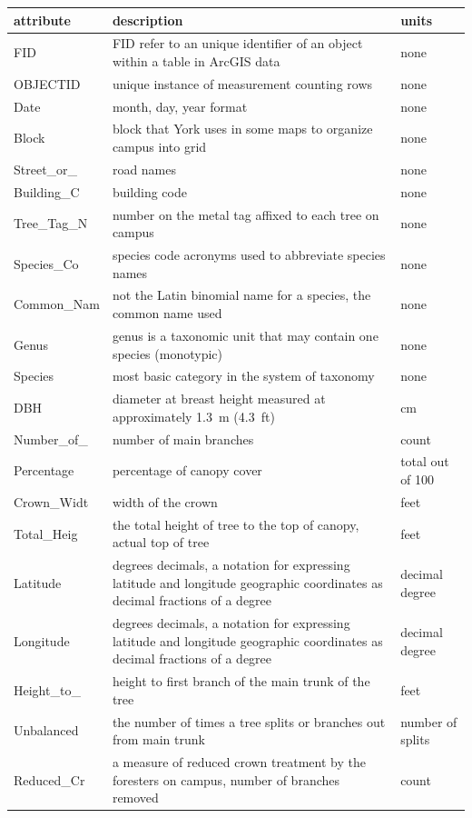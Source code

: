 \documentclass[
]{book}
\begin{document}
\begin{tabular}{lll}
\toprule
attribute & description & units\\
\midrule
FID & FID refer to an unique identifier of an object within a table in ArcGIS data & none\\
OBJECTID & unique instance of measurement counting rows & none\\
Date & month, day, year format & none\\
Block & block that York uses in some maps to organize campus into grid & none\\
Street\_or\_ & road names & none\\
\addlinespace
Building\_C & building code & none\\
Tree\_Tag\_N & number on the metal tag affixed to each tree on campus & none\\
Species\_Co & species code acronyms used to abbreviate species names & none\\
Common\_Nam & not the Latin binomial name for a species, the common name used & none\\
Genus & genus is a taxonomic unit that may contain one species (monotypic) & none\\
\addlinespace
Species & most basic category in the system of taxonomy & none\\
DBH & diameter at breast height measured at approximately 1.3 m (4.3 ft) & cm\\
Number\_of\_ & number of main branches & count\\
Percentage & percentage of canopy cover & total out of 100\\
Crown\_Widt & width of the crown & feet\\
\addlinespace
Total\_Heig & the total height of tree to the top of canopy, actual top of tree & feet\\
Latitude & degrees decimals, a notation for expressing latitude and longitude geographic coordinates as decimal fractions of a degree & decimal degree\\
Longitude & degrees decimals, a notation for expressing latitude and longitude geographic coordinates as decimal fractions of a degree & decimal degree\\
Height\_to\_ & height to first branch of the main trunk of the tree & feet\\
Unbalanced & the number of times a tree splits or branches out from main trunk & number of splits\\
\addlinespace
Reduced\_Cr & a measure of reduced crown treatment by the foresters on campus, number of branches removed & count\\

\end{tabular}
\end{document}
